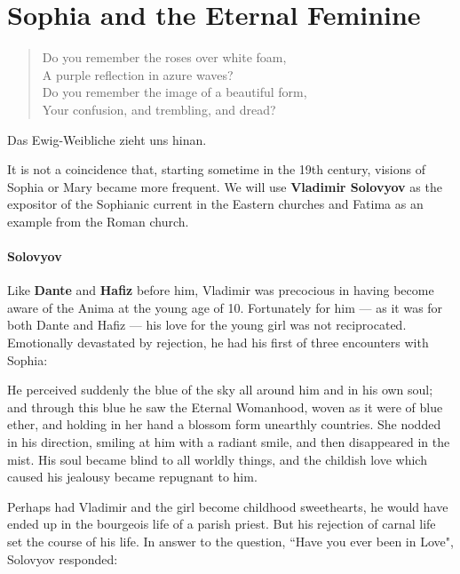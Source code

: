 \section{Sophia and the Eternal Feminine}

\begin{quotex}
\begin{verse}
Do you remember the roses over white foam,\\
A purple reflection in azure waves?\\
Do you remember the image of a beautiful form,\\
Your confusion, and trembling, and dread?
\end{verse}

Das Ewig-Weibliche zieht uns hinan.


\end{quotex}
It is not a coincidence that, starting sometime in the 19th century, visions of Sophia or Mary became more frequent. We will use \textbf{Vladimir Solovyov} as the expositor of the Sophianic current in the Eastern churches and Fatima as an example from the Roman church.

\paragraph{Solovyov}
Like \textbf{Dante} and \textbf{Hafiz} before him, Vladimir was precocious in having become aware of the Anima at the young age of 10. Fortunately for him — as it was for both Dante and Hafiz — his love for the young girl was not reciprocated. Emotionally devastated by rejection, he had his first of three encounters with Sophia:

\begin{quotex}
He perceived suddenly the blue of the sky all around him and in his own soul; and through this blue he saw the Eternal Womanhood, woven as it were of blue ether, and holding in her hand a blossom form unearthly countries. She nodded in his direction, smiling at him with a radiant smile, and then disappeared in the mist. His soul became blind to all worldly things, and the childish love which caused his jealousy became repugnant to him. 

\end{quotex}
Perhaps had Vladimir and the girl become childhood sweethearts, he would have ended up in the bourgeois life of a parish priest. But his rejection of carnal life set the course of his life. In answer to the question, ``Have you ever been in Love", Solovyov responded:

